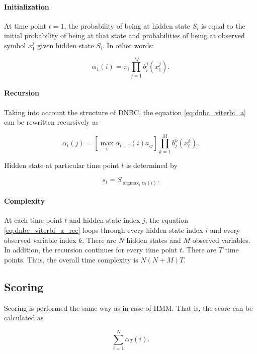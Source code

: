 \documentclass[thesis=B,english]{FITthesis}[2012/06/26]
\DeclareMathOperator*{\argmax}{argmax} %
\begin{document}
\paragraph{Initialization}

At time point $t=1$, the probability of being at hidden state $S_i$ is equal to the initial probability of being at that state and probabilities of being at observed symbol $x_1^j$ given hidden state $S_i$. In other words:

\begin{equation*}
\alpha_1(i) = \pi_i \prod_{j=1}^M b^j_i(x^j_1).
\end{equation*}

\paragraph{Recursion}
Taking into account the structure of DNBC, the equation \ref{eq:dnbc_viterbi_a} can be rewritten recursively as

\begin{equation} \label{eq:dnbc_viterbi_a_rec}
\alpha_t(j) = [\max_i \alpha_{t-1}(i)a_{ij}] \prod_{k=1}^M b_j^k(x^k_t).
\end{equation}

Hidden state at particular time point $t$ is determined by

\begin{equation*}
s_t = S_{\argmax_i \alpha_{t}(i)}.
\end{equation*}

\paragraph{Complexity}

At each time point $t$ and hidden state index $j$, the equation \ref{eq:dnbc_viterbi_a_rec} loops through every hidden state index $i$ and every observed variable index $k$. There are $N$ hidden states and $M$ observed variables. In addition, the recursion continues for every time point $t$. There are $T$ time points. Thus, the overall time complexity is
$N(N+M) T$.

\subsection{Scoring}

Scoring is performed the same way as in case of HMM. That is, the score can be calculated as

\begin{equation*}
\sum_{i=1}^{N} \alpha_T(i).
\end{equation*}
\end{document}

